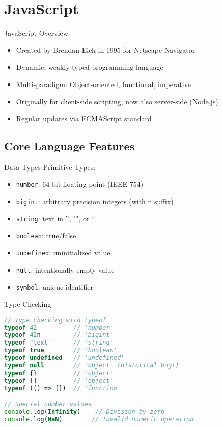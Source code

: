 \section{JavaScript}

\begin{concept}{JavaScript Overview}
    \begin{itemize}
        \item Created by Brendan Eich in 1995 for Netscape Navigator
        \item Dynamic, weakly typed programming language
        \item Multi-paradigm: Object-oriented, functional, imperative
        \item Originally for client-side scripting, now also server-side (Node.js)
        \item Regular updates via ECMAScript standard
    \end{itemize}
\end{concept}

\subsection{Core Language Features}

\begin{definition}{Data Types}
    Primitive Types:
    \begin{itemize}
        \item \texttt{number}: 64-bit floating point (IEEE 754)
        \item \texttt{bigint}: arbitrary precision integers (with n suffix)
        \item \texttt{string}: text in '', "", or ``
        \item \texttt{boolean}: true/false
        \item \texttt{undefined}: uninitialized value
        \item \texttt{null}: intentionally empty value
        \item \texttt{symbol}: unique identifier
    \end{itemize}
\end{definition}

\begin{KR}{Type Checking}
\begin{lstlisting}[language=JavaScript, style=basesmol]
// Type checking with typeof
typeof 42          // 'number'
typeof 42n         // 'bigint'
typeof "text"      // 'string'
typeof true        // 'boolean'
typeof undefined   // 'undefined'
typeof null        // 'object' (historical bug!)
typeof {}          // 'object'
typeof []          // 'object'
typeof (() => {})  // 'function'

// Special number values
console.log(Infinity)    // Division by zero
console.log(NaN)        // Invalid numeric operation
\end{lstlisting}
\end{KR}

